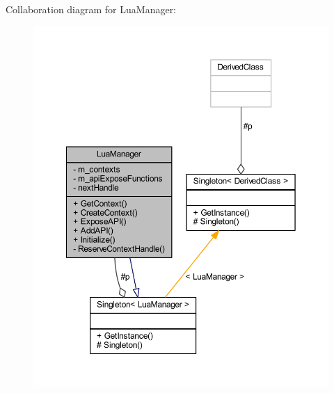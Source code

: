 Collaboration diagram for Lua\+Manager\+:\nopagebreak
\begin{figure}[H]
\begin{center}
\leavevmode
\includegraphics[width=350pt]{class_lua_manager__coll__graph}
\end{center}
\end{figure}
